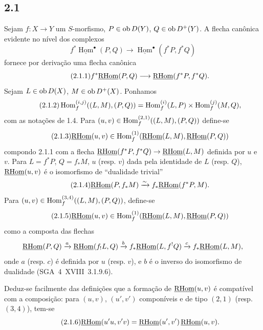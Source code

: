 \subsection*{2.1}
Sejam $f:X\to Y$ um $S$-morfismo, $P\in\operatorname{ob} D(Y)$, $Q\in\operatorname{ob} D^{+}(Y)$. A flecha canônica evidente no nível dos complexos
\[
f^{*}\underline{\operatorname{Hom}}^{\bullet}(P,Q)\longrightarrow\underline{\operatorname{Hom}}^{\bullet}(f^{*}P,f^{*}Q)
\]
fornece por derivação uma flecha canônica
\begin{equation}\tag{2.1.1}
f^{*}\underline{\mathrm{RHom}}(P,Q)\longrightarrow\underline{\mathrm{RHom}}(f^{*}P,f^{*}Q).
\end{equation}
Sejam $L\in\operatorname{ob} D(X)$, $M\in\operatorname{ob} D^{+}(X)$. Ponhamos
\begin{equation}\tag{2.1.2}
\operatorname{Hom}_f^{(i,j)}((L,M),(P,Q))=\operatorname{Hom}_f^{(i)}(L,P)\times\operatorname{Hom}_f^{(j)}(M,Q),
\end{equation}
com as notações de 1.4. Para $(u,v)\in\operatorname{Hom}_f^{(2,1)}((L,M),(P,Q))$ define-se
\begin{equation}\tag{2.1.3}
\underline{\mathrm{RHom}}(u,v)\in\operatorname{Hom}_f^{(1)}(\underline{\mathrm{RHom}}(L,M),\underline{\mathrm{RHom}}(P,Q))
\end{equation}
compondo 2.1.1 com a flecha $\underline{\mathrm{RHom}}(f^{*}P,f^{*}Q)\to\underline{\mathrm{RHom}}(L,M)$ definida por $u$ e $v$. Para $L=f^{*}P$, $Q=f_{*}M$, $u$ (resp. $v$) dada pela identidade de $L$ (resp. $Q$), $\underline{\mathrm{RHom}}(u,v)$ é o isomorfismo de ``dualidade trivial''
\begin{equation}\tag{2.1.4}
\underline{\mathrm{RHom}}(P,f_{*}M)\xrightarrow{\sim}f_{*}\underline{\mathrm{RHom}}(f^{*}P,M).
\end{equation}
Para $(u,v)\in\operatorname{Hom}_f^{(3,4)}((L,M),(P,Q))$, define-se
\begin{equation}\tag{2.1.5}
\underline{\mathrm{RHom}}(u,v)\in\operatorname{Hom}_f^{(1)}(\underline{\mathrm{RHom}}(L,M),\underline{\mathrm{RHom}}(P,Q))
\end{equation}
como a composta das flechas
\[
\underline{\mathrm{RHom}}(P,Q)\xrightarrow{a}\underline{\mathrm{RHom}}(f_{!}L,Q)\xrightarrow{b}f_{*}\underline{\mathrm{RHom}}(L,f^{!}Q)\xrightarrow{c}f_{*}\underline{\mathrm{RHom}}(L,M),
\]
onde $a$ (resp. $c$) é definida por $u$ (resp. $v$), e $b$ é o inverso do isomorfismo de dualidade (SGA~4~XVIII~3.1.9.6).

Deduz-se facilmente das definições que a formação de $\underline{\mathrm{RHom}}(u,v)$ é compatível com a composição: para $(u,v)$, $(u',v')$ componíveis e de tipo $(2,1)$ (resp. $(3,4)$), tem-se
\begin{equation}\tag{2.1.6}
\underline{\mathrm{RHom}}(u'u,v'v)=\underline{\mathrm{RHom}}(u',v')\,\underline{\mathrm{RHom}}(u,v).
\end{equation}

